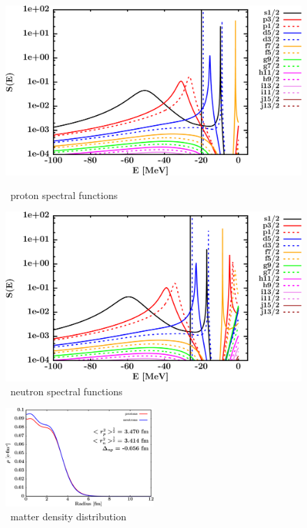 \begin{figure}[H]
    \centering
    \begin{minipage}{0.45\textwidth}
        \centering
        \includegraphics[width=1.0\textwidth]{figures/ca40_protonSpectralFunctions.png}
        \caption{\caForty\ proton spectral functions}
        \label{DOMFitData_ca40_proton_spectralFunctions}
    \end{minipage}\hfill
    \begin{minipage}{0.45\textwidth}
        \centering
        \includegraphics[width=1.0\textwidth]{figures/ca40_neutronSpectralFunctions.png}
        \caption{\caForty\ neutron spectral functions}
        \label{DOMFitData_ca40_neutron_spectralFunctions}
    \end{minipage}
\end{figure}

\begin{figure}[H]
    \centering
    \includegraphics[width = 0.5\textwidth]{figures/ca40_matterDensity.png}
    \caption{\caForty\ matter density distribution}
    \label{DOMFitData_ca40_matterDensity}
\end{figure}

